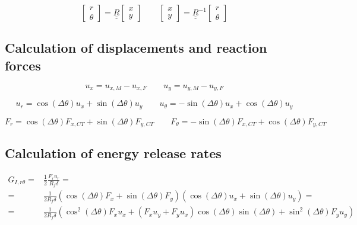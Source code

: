 \documentclass[a4paper]{jpconf}
\begin{document}
\begin{equation}
\begin{bmatrix}
r \\
\theta
\end{bmatrix}=\underline{\underline{R}}\begin{bmatrix}
x \\
y
\end{bmatrix}\qquad\begin{bmatrix}
x \\
y
\end{bmatrix}=\underline{\underline{R}}^{-1}\begin{bmatrix}
r \\
\theta
\end{bmatrix}
\end{equation}

\subsection{Calculation of displacements and reaction forces}

\begin{equation}
u_{x}=u_{x,M}-u_{x,F}\qquad u_{y}=u_{y,M}-u_{y,F}
\end{equation}

\begin{equation}
u_{r}=\cos\left(\Delta\theta\right) u_{x}+\sin\left(\Delta\theta\right) u_{y}\qquad u_{\theta}=-\sin\left(\Delta\theta\right) u_{x}+\cos\left(\Delta\theta\right) u_{y}
\end{equation}

\begin{equation}
F_{r}=\cos\left(\Delta\theta\right) F_{x,CT}+\sin\left(\Delta\theta\right) F_{y,CT}\qquad F_{\theta}=-\sin\left(\Delta\theta\right) F_{x,CT}+\cos\left(\Delta\theta\right) F_{y,CT}
\end{equation}

\subsection{Calculation of energy release rates}

\begin{equation}
\begin{split}
G_{I,r\theta} = &\frac{1}{2}\frac{F_{r}u_{r}}{R_{f}\delta}=\\
= &\frac{1}{2R_{f}\delta}\left(\cos\left(\Delta\theta\right) F_{x}+\sin\left(\Delta\theta\right)F_{y}\right)\left(\cos\left(\Delta\theta\right) u_{x}+\sin\left(\Delta\theta\right) u_{y}\right)=\\
= &\frac{1}{2R_{f}\delta}\left(\cos^{2}\left(\Delta\theta\right) F_{x}u_{x}+\left(F_{x}u_{y}+F_{y}u_{x}\right)\cos\left(\Delta\theta\right)\sin\left(\Delta\theta\right)+\sin^{2}\left(\Delta\theta\right)F_{y}u_{y}\right)\\
\end{split}
\end{equation}
\end{document}
